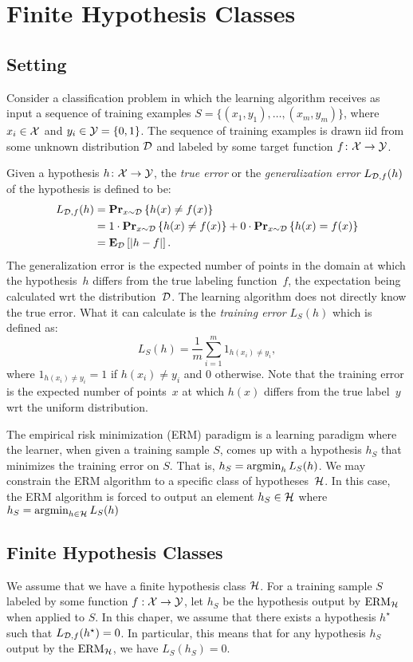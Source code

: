 \chapter{Finite Hypothesis Classes}

\section{Setting}

Consider a classification problem in which the learning algorithm receives as input
a sequence of training examples $S = \{(x_1, y_1), \ldots, (x_m, y_m)\}$,
where $x_i \in \mathcal{X}$ and $y_i \in \mathcal{Y} = \{0, 1\}$. The sequence of training
examples is drawn iid from some unknown distribution $\mathcal{D}$ and labeled by some
target function $f \colon \mathcal{X} \rightarrow \mathcal{Y}$.

Given a hypothesis $h \colon \mathcal{X} \rightarrow \mathcal{Y}$, the \emph{true error}
or the \emph{generalization error} $L_{\mathcal{D}, f}(h)$ of the hypothesis is defined to be:
\begin{align*}
    L_{\mathcal{D}, f}(h) & = \mathbf{Pr}_{x \sim \mathcal{D}} \left \{ h(x) \neq f(x) \right \} \\
                 & = 1 \cdot \mathbf{Pr}_{x \sim \mathcal{D}} \left \{ h(x) \neq f(x) \right \} +
                     0 \cdot \mathbf{Pr}_{x \sim \mathcal{D}} \left \{ h(x) = f(x) \right \} \\
                 & = \mathbf{E}_{\mathcal{D}} \left [ \lvert h - f \rvert \right ].
\end{align*}
The generalization error is the expected number of points in the domain at which
the hypothesis~$h$ differs from the true labeling function~$f$, the expectation being
calculated wrt the distribution~$\mathcal{D}$. The learning
algorithm does not directly know the true error. What it can calculate
is the \emph{training error} $L_{S}(h)$ which is defined as:
\[
    L_S (h) = \frac{1}{m} \sum_{i = 1}^{m} 1_{h(x_i) \neq y_i},
\]
where $1_{h(x_i) \neq y_i} =  1$ if $h(x_i) \neq y_i$ and $0$ otherwise. Note that
the training error is the expected number of points~$x$ at which $h(x)$ differs from
the true label~$y$ wrt the uniform distribution.

The empirical risk minimization (ERM) paradigm is a learning paradigm where the learner,
when given a training sample $S$, comes up with a hypothesis $h_S$ that minimizes
the training error on $S$. That is, $h_S = \operatorname{argmin}_{h} L_S(h)$. We may
constrain the ERM algorithm to a specific class of hypotheses~$\mathcal{H}$. In this
case, the ERM algorithm is forced to output an element $h_S \in \mathcal{H}$ where
$h_S = \operatorname{argmin}_{h \in \mathcal{H}} L_S(h)$


\section{Finite Hypothesis Classes}

We assume that we have a finite hypothesis class $\mathcal{H}$. For a training
sample $S$ labeled by some function $f: \mathcal{X} \rightarrow \mathcal{Y}$, let $h_S$
be the hypothesis output by $\text{ERM}_{\mathcal{H}}$ when applied to $S$. In this chaper,
we assume that there exists a hypothesis $h^{\star}$ such that
$L_{\mathcal{D}, f}(h^{\star}) = 0$. In particular, this means that for any hypothesis $h_S$
output by the $\text{ERM}_{\mathcal{H}}$, we have $L_S(h_S) = 0$.

